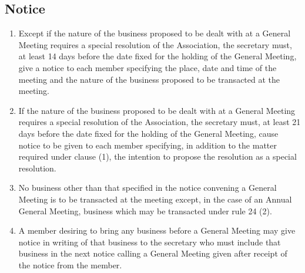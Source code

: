 \subsection{Notice}
\begin{enumerate}
  \item Except if the nature of the business proposed to be dealt with at a General Meeting requires a special resolution of the Association, the secretary must, at least 14 days before the date fixed for the holding of the General Meeting, give a notice to each member specifying the place, date and time of the meeting and the nature of the business proposed to be transacted at the meeting.
  \item If the nature of the business proposed to be dealt with at a General Meeting requires a special resolution of the Association, the secretary must, at least 21 days before the date fixed for the holding of the General Meeting, cause notice to be given to each member specifying, in addition to the matter required under clause (1), the intention to propose the resolution as a special resolution.
  \item No business other than that specified in the notice convening a General Meeting is to be transacted at the meeting except, in the case of an Annual General Meeting, business which may be transacted under rule 24 (2).
  \item A member desiring to bring any business before a General Meeting may give notice in writing of that business to the secretary who must include that business in the next notice calling a General Meeting given after receipt of the notice from the member.
\end{enumerate}
